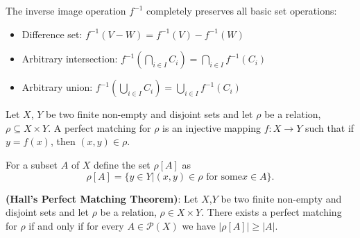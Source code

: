 \documentclass[../main.tex]{subfiles}
\begin{document}
\begin{green}

The inverse image operation $f^{-1}$ completely preserves all basic set operations:
\begin{itemize}
    \item Difference set: $f^{-1}(V - W) = f^{-1}(V) - f^{-1}(W)$
    \item Arbitrary intersection: $f^{-1}\left(\bigcap_{i\in I} C_{i}\right) = \bigcap_{i\in I} f^{-1}(C_{i})$
    \item Arbitrary union: $f^{-1}\left(\bigcup_{i\in I} C_{i}\right) = \bigcup_{i\in I} f^{-1}(C_{i})$
\end{itemize}

\end{green}

\begin{purple}
\begin{definition}

Let $X$, $Y$ be two finite non-empty and disjoint sets and let $\rho$ be a relation, $\rho\subseteq X\times Y$. A perfect matching for $\rho$ is an injective mapping $f:X\rightarrow Y$ such that if $y=f(x)$, then $(x,y)\in \rho$.

For a subset $A$ of $X$ define the set $\rho[A]$ as 
$$
\rho[A]=\{y\in Y|(x,y)\in\rho\text{ for some} x\in A\}.
$$
\end{definition}
\end{purple}

\begin{yellow}
\begin{theorem}

\textbf{(Hall's Perfect Matching Theorem)}: Let $X$,$Y$ be two finite non-empty and disjoint sets and let $\rho$ be a relation, $\rho\in X\times Y$. There exists a perfect matching for $\rho$ if and only if for every $A\in \mathcal{P}(X)$ we have $|\rho[A]|\ge|A|$. 
\end{theorem}
\end{yellow}
\end{document}
